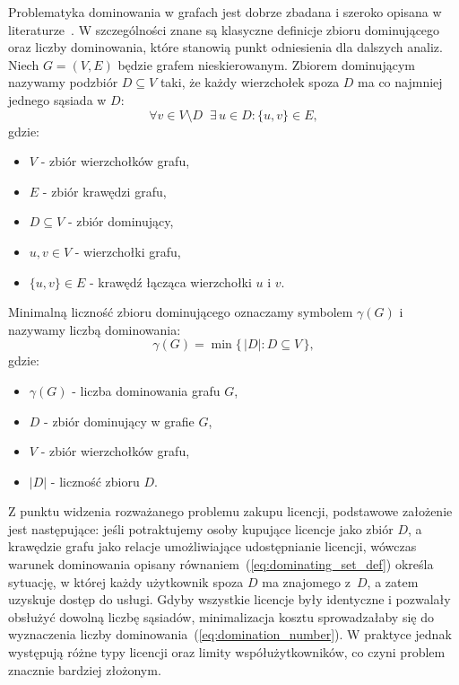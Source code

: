 Problematyka dominowania w grafach jest dobrze zbadana i szeroko opisana w literaturze~\cite{haynes1998domination}.
W szczególności znane są klasyczne definicje zbioru dominującego oraz liczby dominowania, które stanowią punkt odniesienia dla dalszych analiz.
Niech $G=(V,E)$ będzie grafem nieskierowanym.
Zbiorem dominującym nazywamy podzbiór $D \subseteq V$ taki, że każdy wierzchołek spoza $D$ ma co najmniej jednego sąsiada w $D$:
\begin{equation}
  \forall v \in V \setminus D \;\; \exists\, u \in D : \{u,v\} \in E ,
  \label{eq:dominating_set_def}
\end{equation}
gdzie:
\begin{itemize}
  \item $V$ - zbiór wierzchołków grafu,
  \item $E$ - zbiór krawędzi grafu,
  \item $D \subseteq V$ - zbiór dominujący,
  \item $u,v \in V$ - wierzchołki grafu,
  \item $\{u,v\}\in E$ - krawędź łącząca wierzchołki $u$ i $v$.
\end{itemize}


Minimalną liczność zbioru dominującego oznaczamy symbolem $\gamma(G)$ i nazywamy liczbą dominowania:
\begin{equation}
  \gamma(G) = \min \{\, |D| : D \subseteq V \,\},
  \label{eq:domination_number}
\end{equation}
gdzie:
\begin{itemize}
  \item $\gamma(G)$ - liczba dominowania grafu $G$,
  \item $D$ - zbiór dominujący w grafie $G$,
  \item $V$ - zbiór wierzchołków grafu,
  \item $|D|$ - liczność zbioru $D$.
\end{itemize}



Z punktu widzenia rozważanego problemu zakupu licencji, podstawowe założenie jest następujące:
jeśli potraktujemy osoby kupujące licencje jako zbiór \(D\), a krawędzie grafu jako relacje
umożliwiające udostępnianie licencji, wówczas warunek dominowania opisany równaniem~(\ref{eq:dominating_set_def}) określa sytuację,
w której każdy użytkownik spoza $D$ ma znajomego z~$D$, a zatem uzyskuje dostęp do usługi.
Gdyby wszystkie licencje były identyczne i pozwalały obsłużyć dowolną liczbę sąsiadów,
minimalizacja kosztu sprowadzałaby się do wyznaczenia liczby dominowania~(\ref{eq:domination_number}).
W praktyce jednak występują różne typy licencji oraz limity
współużytkowników, co czyni problem znacznie bardziej złożonym.

